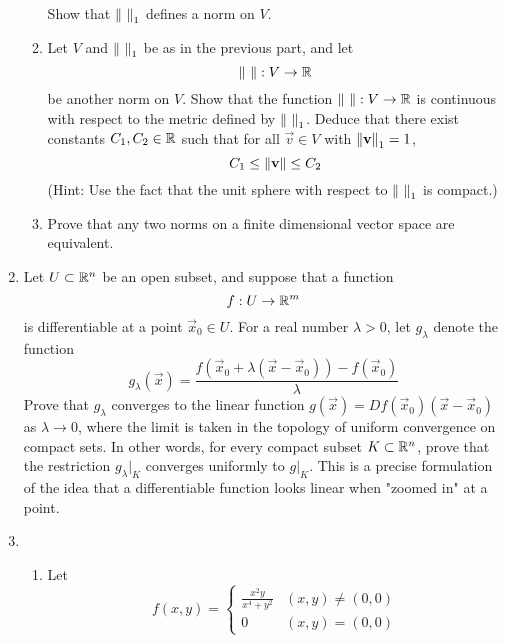 \documentclass[../psets.tex]{subfiles}
\begin{document}
\begin{enumerate}
\begin{enumerate}
\begin{equation*}
        \end{equation*}
        Show that $\norm{\ }_1$ defines a norm on $V$.
        \item Let $V$ and $\norm{\ }_1$ be as in the previous part, and let
        \begin{equation*}
            \norm{\ }:V\to\mathbb{R}
        \end{equation*}
        be another norm on $V$. Show that the function $\norm{\ }:V\to\R$ is continuous with respect to the metric defined by $\norm{\ }_1$. Deduce that there exist constants $C_1,C_2\in\mathbb{R}$ such that for all $\vec{v}\in V$ with $\norm{\mathbf{v}}_1=1$,
        \begin{equation*}
            C_1 \leq \norm{\mathbf{v}} \leq C_2
        \end{equation*}
        (Hint: Use the fact that the unit sphere with respect to $\norm{\ }_1$ is compact.)
        \item Prove that any two norms on a finite dimensional vector space are equivalent.
    \end{enumerate}
    \item Let $U\subset\mathbb{R}^n$ be an open subset, and suppose that a function
    \begin{equation*}
        f:U\to\mathbb{R}^m
    \end{equation*}
    is differentiable at a point $\vec{x}_0\in U$. For a real number $\lambda>0$, let $g_\lambda$ denote the function
    \begin{equation*}
        g_\lambda(\vec{x}) = \frac{f(\vec{x}_0+\lambda(\vec{x}-\vec{x}_0))-f(\vec{x}_0)}{\lambda}
    \end{equation*}
    Prove that $g_\lambda$ converges to the linear function $g(\vec{x})=Df(\vec{x}_0)(\vec{x}-\vec{x}_0)$ as $\lambda\to 0$, where the limit is taken in the topology of uniform convergence on compact sets. In other words, for every compact subset $K\subset\mathbb{R}^n$, prove that the restriction $g_\lambda|_K$ converges uniformly to $g|_K$. This is a precise formulation of the idea that a differentiable function looks linear when "zoomed in" at a point.
    \item 
    \begin{enumerate}
        \item Let
        \begin{equation*}
            f(x,y) =
            \begin{cases}
                \frac{x^2y}{x^4+y^2} & (x,y)\neq(0,0)\\
                0 & (x,y)=(0,0)

\end{cases}
\end{equation*}
\end{enumerate}
\end{enumerate}
\end{document}
